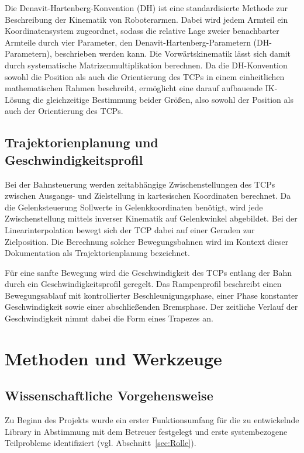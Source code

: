 \documentclass[12pt,a4paper]{article}
\begin{document}
Die Denavit-Hartenberg-Konvention (DH) ist eine standardisierte Methode zur Beschreibung der Kinematik von Roboterarmen. Dabei wird jedem Armteil ein Koordinatensystem zugeordnet, sodass die relative Lage zweier benachbarter Armteile durch vier Parameter, den Denavit-Hartenberg-Parametern (DH-Parametern), beschrieben werden kann. Die Vorwärtskinematik lässt sich damit durch systematische Matrizenmultiplikation berechnen. Da die DH-Konvention sowohl die Position als auch die Orientierung des TCPs in einem einheitlichen mathematischen Rahmen beschreibt, ermöglicht eine darauf aufbauende IK-Lösung die gleichzeitige Bestimmung beider Größen, also sowohl der Position als auch 
der Orientierung des TCPs.

\subsection{Trajektorienplanung und Geschwindigkeitsprofil}

Bei der Bahnsteuerung werden zeitabhängige Zwischenstellungen des TCPs zwischen Ausgangs- und Zielstellung in kartesischen Koordinaten berechnet. Da die Gelenksteuerung Sollwerte in Gelenkkoordinaten benötigt, wird jede Zwischenstellung mittels inverser Kinematik auf Gelenkwinkel abgebildet. Bei der Linearinterpolation bewegt sich der TCP dabei auf einer Geraden zur 
Zielposition. Die Berechnung solcher Bewegungsbahnen wird im Kontext dieser Dokumentation 
als Trajektorienplanung bezeichnet.

Für eine sanfte Bewegung wird die Geschwindigkeit des TCPs entlang der Bahn durch ein Geschwindigkeitsprofil geregelt. Das Rampenprofil beschreibt einen Bewegungsablauf mit kontrollierter Beschleunigungsphase, einer Phase konstanter Geschwindigkeit sowie einer abschließenden Bremsphase. Der 
zeitliche Verlauf der Geschwindigkeit nimmt dabei die Form eines Trapezes an.

\newpage
\section{Methoden und Werkzeuge}

\subsection{Wissenschaftliche Vorgehensweise} 

Zu Beginn des Projekts wurde ein erster Funktionsumfang für die zu entwickelnde Library in Abstimmung mit dem Betreuer festgelegt und erste systembezogene Teilprobleme identifiziert (vgl. Abschnitt~\ref{sec:Rolle}).
\end{document}
